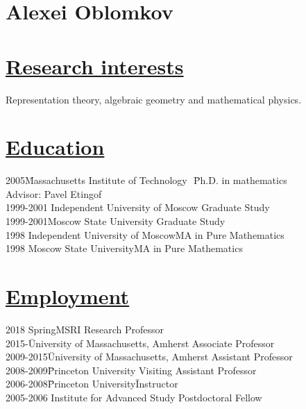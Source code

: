 \documentclass[11pt]{amsart}
\theoremstyle{plain}
\theoremstyle{definition}
\theoremstyle{remark}
\begin{document}
\section*{\bf{\huge Alexei Oblomkov}}
\bigskip

\section*{\Large\underline{Research interests}}



\noindent Representation theory, algebraic geometry
and mathematical physics.




\section*{\Large\underline{Education}}
\begin{tabbing}
2005\quad\quad\quad\quad\quad\= Massachusetts Institute of
Technology   \quad\quad\,\,\:\:\:\:\= Ph.D. in
mathematics\\
\>\quad\quad  \>  Advisor: Pavel Etingof\\
1999-2001\> Independent University of
Moscow\> Graduate Study\\
1999-2001\>Moscow State University\> Graduate Study\\

1998\> Independent University of Moscow\>MA in Pure Mathematics\\
1998\> Moscow State University\>MA in Pure Mathematics
\end{tabbing}


\section*{\Large\underline{Employment}}

\begin{tabbing}
2018 Spring\quad\quad  MSRI \quad\quad\quad\quad\quad\quad\quad\quad\quad\quad\quad\quad\quad\quad\quad\quad\quad Research Professor\\
2015-\quad\quad\quad\quad\;\;\;\= University of Massachusetts, Amherst\quad\quad\;\;\; Associate Professor\\
2009-2015\quad\quad\;\;\;\= University of Massachusetts, Amherst\quad\quad\;\;\; Assistant Professor\\
2008-2009\quad\quad\;\;\;\= Princeton University\quad\quad\quad\quad\quad\quad\quad
\quad\quad\quad\;\; Visiting Assistant
Professor\\
 2006-2008\quad\quad\;\;\:\=        Princeton
University\quad\quad\quad\quad\quad\quad\quad\quad\quad\quad\quad\=
Instructor\\
2005-2006 \>Institute for Advanced Study\> Postdoctoral Fellow
\end{tabbing}
\end{document}
